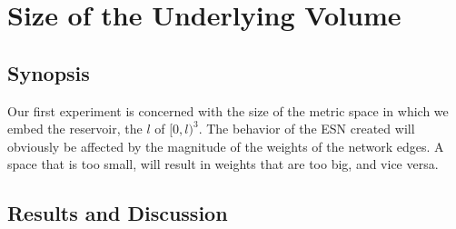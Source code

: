 \section{Size of the Underlying Volume}
\label{sec:volume-size}

\subsection{Synopsis}

Our first experiment is concerned with the size of the metric space in which we
embed the reservoir, the $l$ of $[0, l)^3$. The behavior of the ESN created will
obviously be affected by the magnitude of the weights of the network edges. A
space that is too small, will result in weights that are too big, and vice
versa.

\subsection{Results and Discussion}

